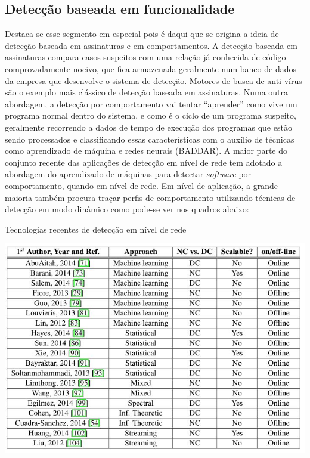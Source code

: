 \subsection{Detecção baseada em funcionalidade}
\label{ss.deteccao_funcionalidade} Destaca-se esse segmento em especial pois é
daqui que se origina a ideia de detecção baseada em assinaturas e em
comportamentos. A detecção baseada em assinaturas compara casos suspeitos com
uma relação já conhecida de código comprovadamente nocivo, que fica armazenada
geralmente num banco de dados da empresa que desenvolve o sistema de detecção.
Motores de busca de anti-vírus são o exemplo mais clássico de detecção baseada
em assinaturas. Numa outra abordagem, a detecção por comportamento vai tentar
``aprender'' como vive um programa normal dentro do sistema, e como é o ciclo
de um programa suspeito, geralmente recorrendo a dados de tempo de execução
dos programas que estão sendo processados e classificando essas
características com o auxílio de técnicas como aprendizado de máquina e redes
neurais (BADDAR). A maior parte do conjunto recente das aplicações de detecção
em nível de rede tem adotado a abordagem do aprendizado de máquinas para
detectar \textit{software} por comportamento, quando em nível de rede. Em nível de
aplicação, a grande maioria também procura traçar perfis de comportamento
utilizando técnicas de detecção em modo dinâmico como pode-se ver nos quadros
abaixo:

\begin{table}[h]
\caption{\small Tecnologias recentes de detecção em nível de rede}
\centering
\includegraphics[scale=0.7]{figs/tabela_deteccao_nivel_rede.JPG}
\label{f.tabeladeteccao_rede}
\end{table}

